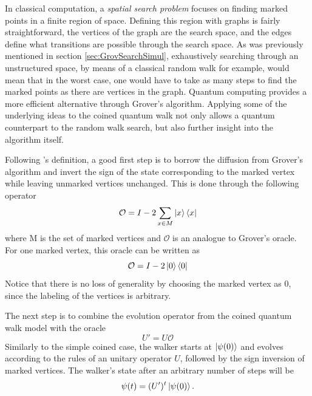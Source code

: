 \documentclass[../../dissertation.tex]{subfiles}
\begin{document}
In classical computation, a \textit{spatial search problem} focuses on finding
marked points in a finite region of space. Defining this region with graphs is
fairly straightforward, the vertices of the graph are the search space, and the
edges define what transitions are possible through the search space. As was
previously mentioned in section \ref{sec:GrovSearchSimul}, exhaustively
searching through an unstructured space, by means of a classical random walk
for example, would mean that in the worst case, one would have to take as many
steps to find the marked points as there are vertices in the graph. Quantum
computing provides a more efficient alternative through Grover's
algorithm. Applying some of the underlying ideas to the coined quantum walk not only
allows a quantum counterpart to the random walk search, but also further
insight into the algorithm itself.\par

Following \cite{REN1}'s definition, a good first step is to borrow the
diffusion from Grover's algorithm and invert the sign of the state
corresponding to the marked vertex while leaving unmarked vertices unchanged.
This is done through the following operator 
\begin{equation}
	\mathcal{O} = I - 2 \sum_{x\in M} \ket{x}\bra{x}
\end{equation}
where M is the set of marked vertices and $\mathcal{O}$ is an analogue to
Grover's oracle. For one marked vertex, this oracle can be written as 
\begin{equation}
	\mathcal{O} = I - 2 \ket{0}\bra{0}
\end{equation}
Notice that there is no loss of generality by choosing the marked vertex as
$0$, since the labeling of the vertices is arbitrary.\par 

The next step is to combine the evolution operator from the coined quantum walk
model with the oracle
\begin{equation}
	U'= U\mathcal{O}
	\label{eq:modUCoinedSimul}
\end{equation}
Similarly to the simple coined case, the walker starts at $\ket{\psi(0)}$ and
evolves according to the rules of an unitary operator $U$, followed by the sign
inversion of marked vertices. The walker's state after an arbitrary number of
steps will be
\begin{equation}
	\psi(t) = (U')^t\ket{\psi(0)}.
	\label{eq:sysStateSearch}
\end{equation}\par
\end{document}
